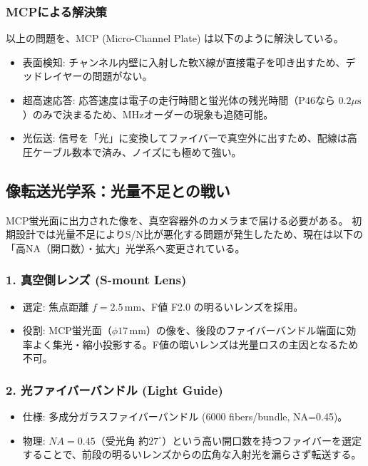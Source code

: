 \subsubsection{MCPによる解決策}
以上の問題を、MCP (Micro-Channel Plate) は以下のように解決している。
\begin{itemize}
    \item 表面検知: チャンネル内壁に入射した軟X線が直接電子を叩き出すため、デッドレイヤーの問題がない。
    \item 超高速応答: 応答速度は電子の走行時間と蛍光体の残光時間（P46なら $0.2 \mu\mathrm{s}$）のみで決まるため、MHzオーダーの現象も追随可能。
    \item 光伝送: 信号を「光」に変換してファイバーで真空外に出すため、配線は高圧ケーブル数本で済み、ノイズにも極めて強い。
\end{itemize}

\subsection{像転送光学系：光量不足との戦い}
MCP蛍光面に出力された像を、真空容器外のカメラまで届ける必要がある。
初期設計では光量不足によりS/N比が悪化する問題が発生したため、現在は以下の「高NA（開口数）・拡大」光学系へ変更されている\cite{Takeda2023}。

\subsubsection{1. 真空側レンズ (S-mount Lens)}
\begin{itemize}
    \item 選定: 焦点距離 $f=2.5\,\mathrm{mm}$、F値 F2.0 の明るいレンズを採用。
    \item 役割: MCP蛍光面（$\phi 17\,\mathrm{mm}$）の像を、後段のファイバーバンドル端面に効率よく集光・縮小投影する。F値の暗いレンズは光量ロスの主因となるため不可。
\end{itemize}

\subsubsection{2. 光ファイバーバンドル (Light Guide)}
\begin{itemize}
    \item 仕様: 多成分ガラスファイバーバンドル (6000 fibers/bundle, NA=0.45)。
    \item 物理: $NA=0.45$（受光角 約$27^\circ$）という高い開口数を持つファイバーを選定することで、前段の明るいレンズからの広角な入射光を漏らさず転送する。
\end{itemize}

